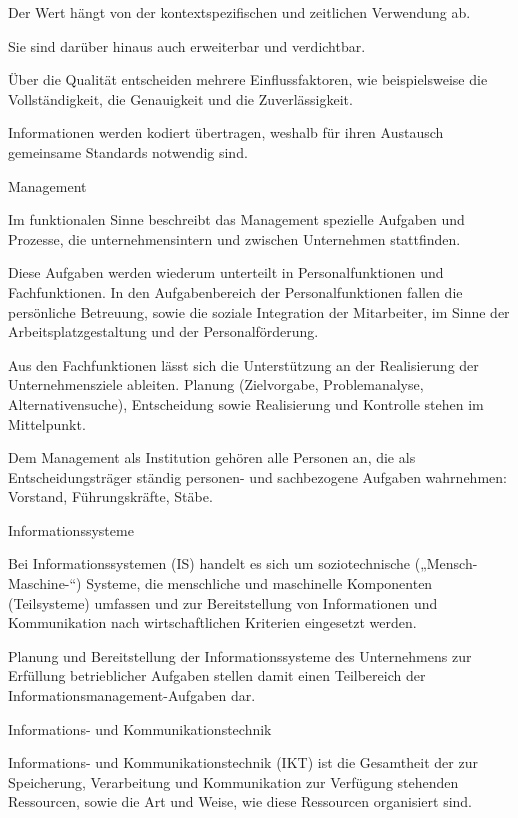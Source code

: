 \documentclass{article}
\begin{document}
Der Wert hängt von der kontextspezifischen und zeitlichen Verwendung ab.

Sie sind darüber hinaus auch erweiterbar und verdichtbar.

Über die Qualität entscheiden mehrere Einflussfaktoren, wie beispielsweise die Vollständigkeit, die Genauigkeit und die
Zuverlässigkeit.

Informationen werden kodiert übertragen, weshalb für ihren Austausch gemeinsame Standards notwendig sind.


\bigskip

Management

Im funktionalen Sinne beschreibt das Management spezielle Aufgaben und Prozesse, die unternehmensintern und zwischen
Unternehmen stattfinden.

Diese Aufgaben werden wiederum unterteilt in Personalfunktionen und Fachfunktionen. In den Aufgabenbereich der
Personalfunktionen fallen die persönliche Betreuung, sowie die soziale Integration der Mitarbeiter, im Sinne der
Arbeitsplatzgestaltung und der Personalförderung.

Aus den Fachfunktionen lässt sich die Unterstützung an der Realisierung der Unternehmensziele ableiten. Planung
(Zielvorgabe, Problemanalyse, Alternativensuche), Entscheidung sowie Realisierung und Kontrolle stehen im Mittelpunkt.

Dem Management als Institution gehören alle Personen an, die als Entscheidungsträger ständig personen- und sachbezogene
Aufgaben wahrnehmen: Vorstand, Führungskräfte, Stäbe.


\bigskip

Informationssysteme

Bei Informationssystemen (IS) handelt es sich um soziotechnische („Mensch-Maschine-“) Systeme, die menschliche und
maschinelle Komponenten (Teilsysteme) umfassen und zur Bereitstellung von Informationen und Kommunikation nach
wirtschaftlichen Kriterien eingesetzt werden.

Planung und Bereitstellung der Informationssysteme des Unternehmens zur Erfüllung betrieblicher Aufgaben stellen damit
einen Teilbereich der Informationsmanagement-Aufgaben dar. \newline


Informations- und Kommunikationstechnik

Informations- und Kommunikationstechnik (IKT) ist die Gesamtheit der zur Speicherung, Verarbeitung und Kommunikation zur
Verfügung stehenden Ressourcen, sowie die Art und Weise, wie diese Ressourcen organisiert sind.
\end{document}
